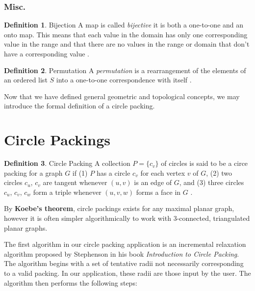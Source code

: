 \documentclass[11pt]{article}
\theoremstyle{definition}
\newtheorem{definition}{Definition}[section]
\begin{document}
\subsubsection{Misc.}
	\theoremstyle{definition}
	\begin{definition}{Bijection}
		A map is called \emph{bijective} it is both a one-to-one and an onto map. 
		This means that each value in the domain has only one corresponding value in the range and that there are no values in the range or domain that don't have a corresponding value \cite{mathworld:Bijection}. 
	\end{definition}
	
	\theoremstyle{definition}
	\begin{definition}{Permutation}
		 A \emph{permutation} is a rearrangement of the elements of an ordered list $S$ into a one-to-one correspondence with itself \cite{mathworld:Permutation}.
	\end{definition}
	
	Now that we have defined general geometric and topological concepts, we may introduce the formal definition of a circle packing.

\section{Circle Packings}
	\theoremstyle{definition}
	\begin{definition}{Circle Packing}
		A collection $P = \{c_v\}$ of circles is said to be a circe packing for a graph $G$ if 
		(1) $P$ has a circle $c_v$ for each vertex $v$ of $G$, 
		(2) two circles $c_u$, $c_v$ are tangent whenever $(u,v)$ is an edge of $G$, and 
		(3) three circles $c_u$, $c_v$, $c_w$ form a triple whenever $(u,v,w)$ forms a face in $G$ \cite{stephenson05introduction}.
	\end{definition}

	By \textbf{Koebe's theorem}, circle packings exists for any maximal planar graph, however it is often simpler algorithmically to work with 3-connected, triangulated planar graphs.

	The first algorithm in our circle packing application is an incremental relaxation algorithm proposed by Stephenson in his book \emph{Introduction to Circle Packing}. 
	The algorithm begins with a set of tentative radii not necessarily corresponding to a valid packing. In our application, these radii are those input by the user. 
	The algorithm then performs the following steps:
	
\end{document}
